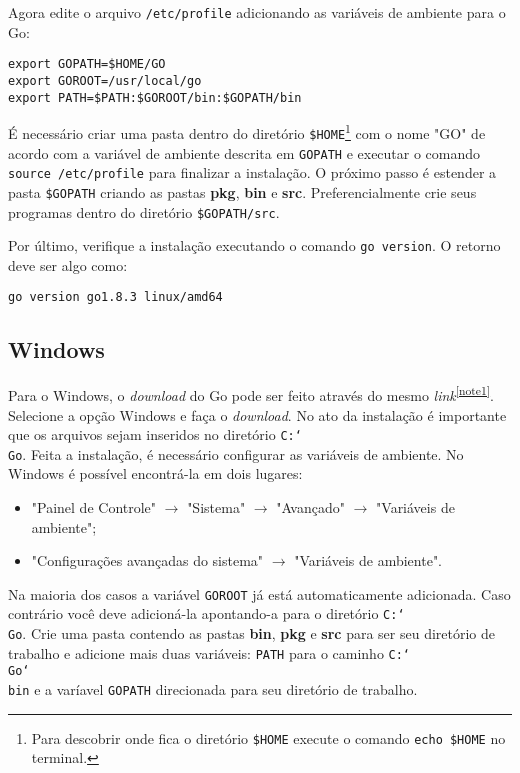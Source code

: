 \documentclass{SBCbookchapter}
\begin{document}
Agora edite o arquivo \texttt{/etc/profile} adicionando as variáveis de ambiente para o Go:

\noindent\texttt{export GOPATH=\$HOME/GO}\\
\texttt{export GOROOT=/usr/local/go}\\
\texttt{export PATH=\$PATH:\$GOROOT/bin:\$GOPATH/bin}

É necessário criar uma pasta dentro do diretório \texttt{\$HOME}\footnote{Para descobrir onde fica o diretório \texttt{\$HOME} execute o comando \texttt{echo \$HOME} no terminal.} com o nome "GO" de acordo com a variável de ambiente descrita em \texttt{GOPATH} e executar o comando \texttt{source /etc/profile} para finalizar a instalação. O próximo passo é estender a pasta \texttt{\$GOPATH} criando as pastas \textbf{pkg}, \textbf{bin} e \textbf{src}. Preferencialmente crie seus programas dentro do diretório \texttt{\$GOPATH/src}.

Por último, verifique a instalação executando o comando \texttt{go version}. O retorno deve ser algo como:

\noindent\texttt{go version go1.8.3 linux/amd64}


\subsection{Windows}

Para o Windows, o \textit{download} do Go pode ser feito através do mesmo \textit{link}\textsuperscript{\ref{note1}}. Selecione a opção Windows e faça o \textit{download}. No ato da instalação é importante que os arquivos sejam inseridos no diretório \texttt{C:\char`\\Go}. Feita a instalação, é necessário configurar as variáveis de ambiente. No Windows é possível encontrá-la em dois lugares:

\begin{itemize}
	\item "Painel de Controle" $\rightarrow$ "Sistema" $\rightarrow$ "Avançado" $\rightarrow$ "Variáveis de ambiente";
	\item "Configurações avançadas do sistema" $\rightarrow$ "Variáveis de ambiente".
\end{itemize}

Na maioria dos casos a variável \texttt{GOROOT} já está automaticamente adicionada. Caso contrário você deve adicioná-la apontando-a para o diretório \texttt{C:\char`\\Go}. Crie uma pasta contendo as pastas \textbf{bin}, \textbf{pkg} e \textbf{src} para ser seu diretório de trabalho e adicione mais duas variáveis: \texttt{PATH} para o caminho \texttt{C:\char`\\Go\char`\\bin} e a varíavel \texttt{GOPATH} direcionada para seu diretório de trabalho.
\end{document}
